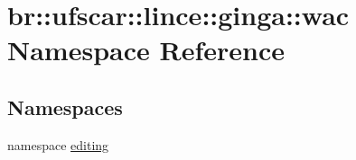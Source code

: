 \hypertarget{namespacebr_1_1ufscar_1_1lince_1_1ginga_1_1wac}{
\section{br::ufscar::lince::ginga::wac Namespace Reference}
\label{namespacebr_1_1ufscar_1_1lince_1_1ginga_1_1wac}
}
\subsection*{Namespaces}
\begin{DoxyCompactItemize}
\item 
namespace \hyperlink{namespacebr_1_1ufscar_1_1lince_1_1ginga_1_1wac_1_1editing}{editing}
\end{DoxyCompactItemize}
